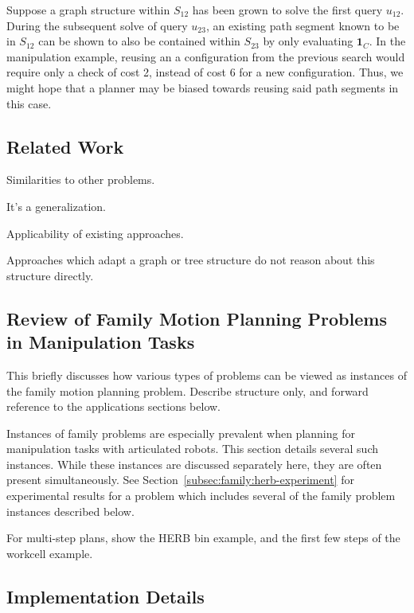 Suppose a graph structure within ${S_{12}}$ has been grown to solve
the first query $u_{12}$.
During the subsequent solve of query $u_{23}$,
an existing path segment known to be in ${S_{12}}$ can be shown to
also be contained within ${S_{23}}$ by only evaluating $\mathbf{1}_C$.
In the manipulation example,
reusing an a configuration from the previous search
would require only a check of cost 2,
instead of cost 6 for a new configuration.
Thus, we might hope that a planner may be biased towards reusing
said path segments in this case.

\subsection{Related Work}

Similarities to other problems.

It's a generalization.

Applicability of existing approaches.

Approaches which adapt a graph or tree structure
\citep{ferguson2006drrt, gayle2007lazyreconfigforest}
do not reason about this structure directly.


\subsection{Review of Family Motion Planning Problems in Manipulation Tasks}

This briefly discusses how various types of problems can be viewed
as instances of the family motion planning problem.
Describe structure only, and forward reference to the applications
sections below.

Instances of family problems are especially prevalent when
planning for manipulation tasks with articulated robots.
This section details several such instances.
While these instances are discussed separately here,
they are often present simultaneously.
See Section~\ref{subsec:family:herb-experiment}
for experimental results for a problem
which includes several of the family problem instances
described below.

For multi-step plans, show the HERB bin example,
and the first few steps of the workcell example.

\subsection{Implementation Details}

